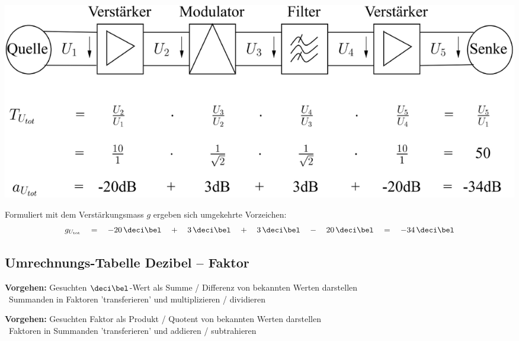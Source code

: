 
\includegraphics[width=0.9\columnwidth]{images/kaskadierung_verstaerkung_daempfung.png}

Formuliert mit dem Verstärkungsmass $g$ ergeben sich umgekehrte Vorzeichen:
$$ g_{U_{\rm tot}} \quad = \quad - 20 \, \deci\bel \quad  + \quad 3 \, \deci\bel \quad + 
    \quad 3 \, \deci\bel \quad - \quad 20 \, \deci\bel \quad = \quad -34 \, \deci\bel $$


\subsection{Umrechnungs-Tabelle Dezibel -- Faktor}

\textbf{Vorgehen:} Gesuchten $\deci\bel$-Wert als Summe / Differenz von bekannten Werten darstellen\\
\textrightarrow\ Summanden in Faktoren 'transferieren' und multiplizieren / dividieren \medskip

\textbf{Vorgehen:} Gesuchten Faktor als Produkt / Quotent von bekannten Werten darstellen\\
\textrightarrow\ Faktoren in Summanden 'transferieren' und addieren / subtrahieren \medskip


